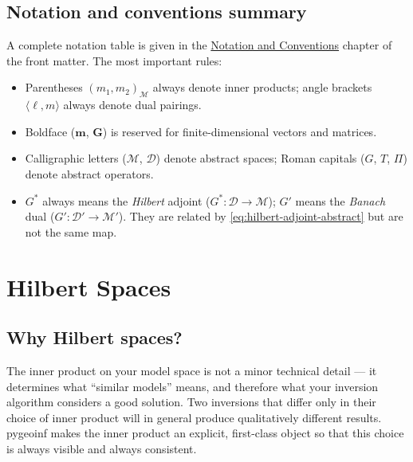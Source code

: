 \documentclass[11pt,twoside,openright]{book}
\theoremstyle{plain}
\theoremstyle{definition}
\theoremstyle{remark}
\newcommand{\modelspace}{\mathcal{M}}
\newcommand{\dataspace}{\mathcal{D}}
\begin{document}
\section{Notation and conventions summary}
\label{sec:notation-summary}

A complete notation table is given in the \hyperref[notation]{Notation
and Conventions} chapter of the front matter. The most important rules:

\begin{itemize}
  \item Parentheses $(m_1, m_2)_{\modelspace}$ always denote inner products;
    angle brackets $\langle \ell, m \rangle$ always denote dual pairings.
  \item Boldface ($\mathbf{m}$, $\mathbf{G}$) is reserved for
    finite-dimensional vectors and matrices.
  \item Calligraphic letters ($\modelspace$, $\dataspace$) denote abstract
    spaces; Roman capitals ($G$, $T$, $\Pi$) denote abstract operators.
  \item $G^*$ always means the \emph{Hilbert} adjoint
    ($G^*: \dataspace \to \modelspace$); $G'$ means the \emph{Banach} dual
    ($G': \dataspace' \to \modelspace'$). They are related by
    \eqref{eq:hilbert-adjoint-abstract} but are not the same map.
\end{itemize}


\chapter{Hilbert Spaces}
\label{ch:hilbert-spaces}

\section{Why Hilbert spaces?}
\label{sec:why-hilbert}

\begin{whybox}
The inner product on your model space is not a minor technical detail ---
it determines what ``similar models'' means, and therefore what your
inversion algorithm considers a good solution. Two inversions that differ
only in their choice of inner product will in general produce qualitatively
different results. pygeoinf makes the inner product an explicit,
first-class object so that this choice is always visible and always
consistent.
\end{whybox}
\end{document}
